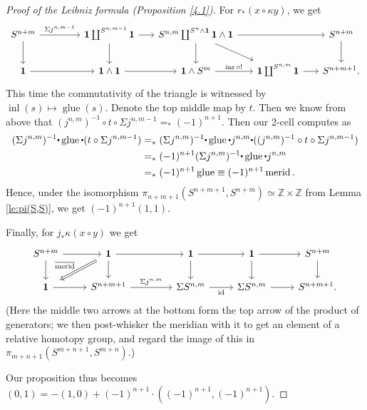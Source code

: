 \documentclass{amsart}
\theoremstyle{definition}
\newcommand{\id}{\operatorname{id}}
\newcommand{\inl}{\operatorname{inl}}
\newcommand{\inr}{\operatorname{inr}}
\newcommand{\glue}{\operatorname{glue}}
\newcommand{\merid}{\operatorname{merid}}
\newcommand{\mmerid}{\overline{{\operatorname{merid}}}}
\newcommand{\sgtn}{\mathbf{1}}
\newcommand{\whisk}{\raisebox{0.5ex}{$\displaystyle\centerdot$}}
\begin{document}
\begin{proof}[Proof of the Leibniz formula (Proposition \ref{4.1})]
For $r_* (x \circ \kappa y )$, we get
\[\begin{tikzcd}[column sep=1.6em]
	{S^{n+m}} &[2.6em] {\sgtn \coprod^{S^{n,m-1}} \sgtn} & {S^{n,m} \coprod^{S^{n} \wedge \sgtn}\sgtn \wedge \sgtn} && {S^{n+m}} \\
	\sgtn & {\sgtn \wedge \sgtn} & {\sgtn \wedge S^{m}} & {\sgtn \coprod^{S^{n,m}} \sgtn} & {S^{n+m+1}.}
	\arrow["{\Sigma j^{n,m-1}}", from=1-1, to=1-2]
	\arrow[from=1-1, to=2-1]
	\arrow[from=1-2, to=1-3]
	\arrow[from=1-2, to=2-2]
	\arrow[from=1-3, to=1-5]
	\arrow[from=1-3, to=2-3]
	\arrow[from=1-3, to=2-4]
	\arrow[from=1-5, to=2-5]
	\arrow[from=2-1, to=2-2]
	\arrow[from=2-2, to=2-3]
	\arrow["{\inr\circ !}", from=2-3, to=2-4]
	\arrow[from=2-4, to=2-5]
\end{tikzcd}\]
This time the commutativity of the triangle is witnessed by $\inl(s) \mapsto \glue(s)$. Denote the top middle map by $t$. Then we know from above that $(j^{n,m})^{-1} \circ t \circ \Sigma j^{n, m-1} =_* (-1)^{n+1}$. Then our 2-cell computes as
\begin{align*}
(\Sigma j^{n,m})^{-1} \whisk \glue \whisk (t \circ \Sigma j^{n, m-1})
&=_* (\Sigma j^{n,m})^{-1} \whisk \glue \whisk j^{n,m} \whisk ((j^{n,m})^{-1} \circ t \circ \Sigma j^{n, m-1}) \\
&=_* (-1)^{n+1} (\Sigma j^{n,m})^{-1} \whisk \glue \whisk  j^{n,m} \\
&=_* (-1)^{n+1} \glue \equiv (-1)^{n+1} \merid.
\end{align*}
Hence, under the isomorphism $\pi_{n+m+1}(S^{n+m+1}, S^{n+m}) \simeq \mathbb{Z} \times \mathbb{Z}$ from Lemma \ref{le:pi(S,S)}, we get
$(-1)^{n+1}(1, 1)$.

Finally, for $j_* \kappa (x \circ y)$ we get
\[\begin{tikzcd}
	{S^{n+m}} & \sgtn &[1.8em] \sgtn & \sgtn & {S^{n+m}} \\
	\sgtn & {S^{n+m+1}} & {\Sigma S^{n,m}} & {\Sigma S^{n,m}} & {S^{n+m+1}.}
	\arrow[from=1-1, to=1-2]
	\arrow[from=1-1, to=2-1]
	\arrow[from=1-2, to=1-3]
	\arrow["\mmerid"', shorten <=5pt, shorten >=8pt, Rightarrow, from=1-2, to=2-1]
	\arrow[from=1-2, to=2-2]
	\arrow[from=1-3, to=1-4]
	\arrow[from=1-3, to=2-3]
	\arrow[from=1-4, to=1-5]
	\arrow[from=1-4, to=2-4]
	\arrow[from=1-5, to=2-5]
	\arrow[from=2-1, to=2-2]
	\arrow["{\Sigma j^{n,m}}", from=2-2, to=2-3]
	\arrow["\id"', from=2-3, to=2-4]
	\arrow[from=2-4, to=2-5]
\end{tikzcd}\]
(Here the middle two arrows at the bottom form the top arrow of the product of generators; we then post-whisker the meridian with it to get an element of a relative homotopy group, and regard the image of this in $\pi_{m+n+1}(S^{m+n+1}, S^{m+n})$.)

Our proposition thus becomes $(0, 1) = -(1, 0) + (-1)^{n+1} \cdot ((-1)^{n+1}, (-1)^{n+1})$.
\end{proof}
\end{document}
